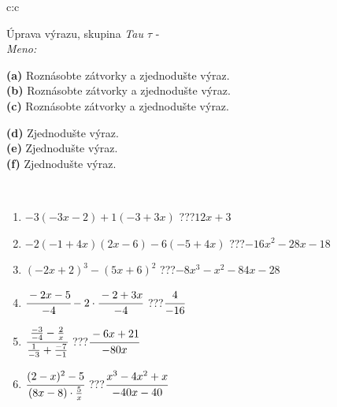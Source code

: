 \documentclass[10pt]{report}
\begin{document}
\newpage
\thispagestyle{empty}
\begin{tabular}{c:c}
\begin{minipage}[c][104.5mm][t]{0.5\linewidth}
\begin{center}
\vspace{7mm}
{\huge Úprava výrazu, skupina \textit{Tau $\tau$} -}\\[5mm]
\textit{Meno:}\phantom{xxxxxxxxxxxxxxxxxxxxxxxxxxxxxxxxxxxxxxxxxxxxxxxxxxxxxxxxxxxxxxxxx}\\[5mm]
\begin{minipage}{0.95\linewidth}
\begin{center}
{\small \begin{minipage}{0.6\textwidth}
\textbf{(a)} Roznásobte zátvorky a zjednodušte výraz. \\[1mm]
\textbf{(b)} Roznásobte zátvorky a zjednodušte výraz. \\[1mm]
\textbf{(c)} Roznásobte zátvorky a zjednodušte výraz.
\end{minipage} \begin{minipage}{0.39\textwidth}
\textbf{(d)} Zjednodušte výraz. \\[1mm]
\textbf{(e)} Zjednodušte výraz. \\[1mm]
\textbf{(f)} Zjednodušte výraz.
\end{minipage}
}
\end{center}
\end{minipage}
\\[4mm]
\begin{minipage}{0.79\linewidth}
\begin{center}
\begin{varwidth}{\linewidth}
\begin{enumerate}
\normalsize
\item $-3(-3x-2)+1(-3+3x)$\quad \dotfill\; ???\;\dotfill \quad $12x+3$
\item $-2(-1+4x)(2x-6)-6(-5+4x)$\quad \dotfill\; ???\;\dotfill \quad $-16x^2-28x-18$
\item $(-2x+2)^3-(5x+6)^2$\quad \dotfill\; ???\;\dotfill \quad $-8x^3-x^2-84x-28$
\item $\cfrac{-2x-5}{-4}-2\cdot\cfrac{-2+3x}{-4}$\quad \dotfill\; ???\;\dotfill \quad $\cfrac{4}{-16}$
\item $\cfrac{\frac{-3}{-4}-\frac{2}{x}}{\frac{1}{-3}+\frac{-7}{-1}}$\quad \dotfill\; ???\;\dotfill \quad $\cfrac{-6x+21}{-80x}$
\item $\cfrac{(2-x)^2-5}{(8x-8)\cdot\frac{5}{x}}$\quad \dotfill\; ???\;\dotfill \quad $\cfrac{x^3-4x^2+x}{-40x-40}$

\end{enumerate}
\end{varwidth}
\end{center}
\end{minipage}
\end{center}
\end{minipage}
\end{tabular}
\end{document}

